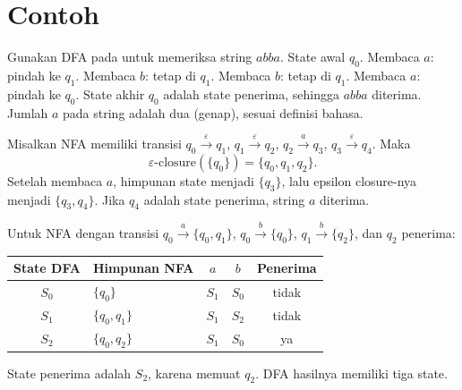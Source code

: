 \section*{Contoh}

\begin{contoh}
Gunakan DFA pada  untuk memeriksa string
\(abba\). State awal \(q_0\). Membaca \(a\): pindah ke \(q_1\).
Membaca \(b\): tetap di \(q_1\). Membaca \(b\): tetap di \(q_1\).
Membaca \(a\): pindah ke \(q_0\). State akhir \(q_0\) adalah state
penerima, sehingga \(abba\) diterima. Jumlah \(a\) pada string adalah
dua (genap), sesuai definisi bahasa.
\end{contoh}

\begin{contoh}
Misalkan NFA memiliki transisi
\(q_0 \xrightarrow{\varepsilon} q_1\),
\(q_1 \xrightarrow{\varepsilon} q_2\),
\(q_2 \xrightarrow{a} q_3\),
\(q_3 \xrightarrow{\varepsilon} q_4\).
Maka
\[
\varepsilon\text{-closure}(\{q_0\}) = \{q_0,q_1,q_2\}.
\]
Setelah membaca \(a\), himpunan state menjadi
\(\{q_3\}\), lalu epsilon closure-nya menjadi
\(\{q_3,q_4\}\). Jika \(q_4\) adalah state penerima, string \(a\)
diterima.
\end{contoh}

\begin{contoh}
Untuk NFA dengan transisi
\(q_0 \xrightarrow{a} \{q_0,q_1\}\),
\(q_0 \xrightarrow{b} \{q_0\}\),
\(q_1 \xrightarrow{b} \{q_2\}\), dan \(q_2\) penerima:
\begin{center}
\small
\begin{tabular}{@{}c l c c c@{}}
\toprule
\textbf{State DFA} & \textbf{Himpunan NFA} &
\textbf{\(a\)} & \textbf{\(b\)} & \textbf{Penerima} \\
\midrule
\(S_0\) & \(\{q_0\}\) & \(S_1\) & \(S_0\) & tidak \\
\(S_1\) & \(\{q_0,q_1\}\) & \(S_1\) & \(S_2\) & tidak \\
\(S_2\) & \(\{q_0,q_2\}\) & \(S_1\) & \(S_0\) & ya \\
\bottomrule
\end{tabular}
\end{center}
State penerima adalah \(S_2\), karena memuat \(q_2\). DFA hasilnya
memiliki tiga state.
\end{contoh}

